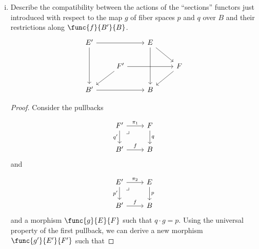 \documentclass[../../main]{subfiles}
\begin{document}
\begin{exercise}
\begin{enumerate}[(i),resume]
\begin{proof}
				For morphisms $\qty{f',g'}$  and $\qty{f,g}$ such that
				$\qty{f,g} \cdot \qty{f',g'}$ makes sense, if $s \in \Sect p$
				with $ \sm_{\qty{f,g}}\qty{s} = s'$ and $
				\sm_{\qty{f',g'}}\qty{s'} = s''$, then $s \cdot g = f \cdot
				s'$ and $s' \cdot g' = f' \cdot s''$ by the universal property
				of pullbacks $\qty{f',g'}$  and $\qty{f,g}$. We get that $s
				\cdot g \cdot g' = f \cdot s' \cdot g' = f \cdot f' \cdot s'' $.
				Since $s''$ is a section of $p''$ this allows the following
				diagram to commute:
				\[\begin{tikzcd}
					B \ar[drr, bend left, "s \cdot g \cdot g' "]
					\ar[ddr, bend right, "1_{B''}"]
					\ar[dr, dotted, "s''" description] & & \\ &
					E'' \ar[r, "f \cdot f'"] \ar[d, "p''"] \ar[dr, phantom,
					"\lrcorner", very near start] &
					E \ar[d, "p"] \\ & B'' \ar[r,"g \cdot g'"] & B
				\end{tikzcd}\]
				showing that $ s'' =
				\sm_{\qty{f',g'}}\qty{\sm_{\qty{f,g}}\qty{s}} =
				\sm_{\qty{f,g}\cdot \qty{f',g'}}\qty{s} $ for all $s \in
				\Sect p$. Thus, $\sm_{\qty{f,g}\cdot \qty{f',g'}} =
				\sm_{\qty{f',g'}} \cdot \sm_{\qty{f,g}}$. This shows that
				$\Sect$ preserves composition. Therefore, $\Sect$ is a functor.
			\end{proof}

		\item Describe the compatibility between the actions of the ``sections''
			functors just introduced with respect to the map \(g\) of fiber
			spaces \(p\) and \(q\) over \(B\) and their restrictions along
			\(\func{f}{B'}{B}\).
			\[\begin{tikzcd}
					E' \ar[rr] \ar[dd] && E \ar[dd] \ar[dr] \\ &
					F' \ar[rr] \ar[dl] && F \ar[dl] \\
					B' \ar[rr] && B
			\end{tikzcd}\]
			\begin{proof}
				Consider the pullbacks

				$$ \begin{tikzcd}
					F' \ar[r, "\pi_{1}"] \ar[d, "q'" {left}] \arrow[dr, phantom, "\lrcorner", very near start] & F \ar[d, "q"] \\
					B' \ar[r, "f"] & B
				\end{tikzcd} $$ and

				$$ \begin{tikzcd}
					E' \ar[r, "\pi_{2}"] \ar[d, "p'" {left}] \arrow[dr, phantom, "\lrcorner", very near start] & E \ar[d, "p"] \\
					B' \ar[r, "f"] & B
				\end{tikzcd} $$ and a morphism $\func{g}{E}{F}$ such that $q \cdot g = p$. Using the universal property of the first pullback, we can derive a new morphism $\func{g'}{E'}{F'}$ such that


\end{proof}
\end{enumerate}
\end{exercise}
\end{document}
